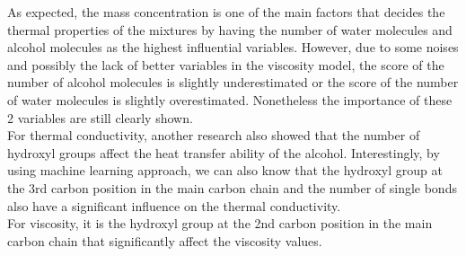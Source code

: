 As expected, the mass concentration is one of the main factors that decides 
the thermal properties of the mixtures by having the number of water molecules 
and alcohol molecules as the highest influential variables. However, due to 
some noises and possibly the lack of better variables in the viscosity model, 
the score of the number of alcohol molecules is slightly underestimated or the 
score of the number of water molecules is slightly overestimated. Nonetheless 
the importance of these 2 variables are still clearly shown.\\
For thermal conductivity, another research \cite{manjunatha_investigation_2017} also showed that 
the number of hydroxyl groups affect the heat transfer ability of the alcohol. 
Interestingly, by using machine learning approach, we can also know that the 
hydroxyl group at the 3rd carbon position in the main carbon chain and the 
number of single bonds also have a significant influence on the thermal 
conductivity.\\
For viscosity, it is the hydroxyl group at the 2nd carbon position in the 
main carbon chain that significantly affect the viscosity values.
